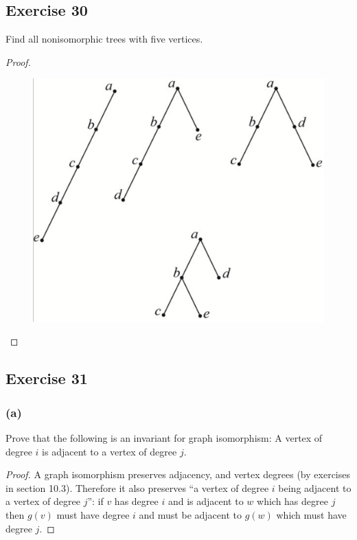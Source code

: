 \documentclass[14pt]{extarticle}
\begin{document}
\subsection{Exercise 30}
Find all nonisomorphic trees with five vertices.
\begin{proof}
\begin{figure}[ht!]
\centering
\includegraphics[scale=0.2]{../images/10.4.30.png}
\end{figure}
\end{proof}

\subsection{Exercise 31}
\subsubsection{(a)}
Prove that the following is an invariant for graph isomorphism: A vertex of degree \(i\) is adjacent to a vertex 
of degree \(j\).

\begin{proof}
A graph isomorphism preserves adjacency, and vertex degrees (by exercises in section 10.3). Therefore it also preserves 
``a vertex of degree \(i\) being adjacent to a vertex of degree \(j\)'': if \(v\) has degree \(i\) and is adjacent to 
\(w\) which has degree \(j\) then \(g(v)\) must have degree \(i\) and must be adjacent to \(g(w)\) which must have degree 
\(j\).
\end{proof}
\end{document}
